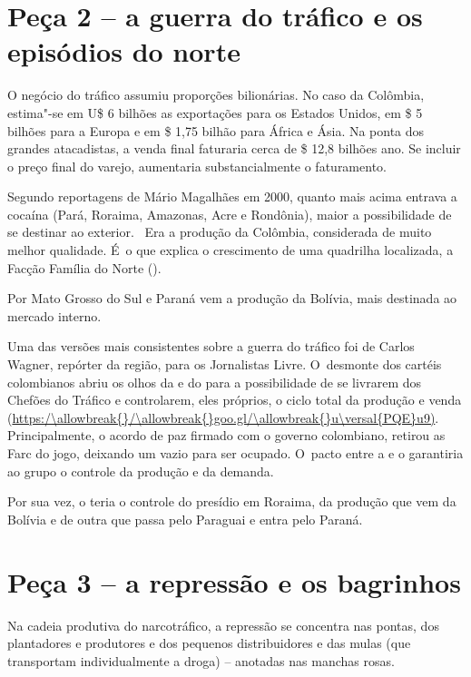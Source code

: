 \section{Peça 2 -- a guerra do tráfico e os episódios do norte}

O negócio do tráfico assumiu proporções bilionárias. No caso da
Colômbia, estima"-se em U\$ 6 bilhões as exportações para os Estados
Unidos, em \$ 5 bilhões para a Europa e em \$ 1,75 bilhão para
África e Ásia. Na ponta dos grandes atacadistas, a venda final faturaria
cerca de \$ 12,8 bilhões ano. Se incluir o preço final do varejo,
aumentaria substancialmente o faturamento.

Segundo reportagens de Mário Magalhães em 2000, quanto mais acima
entrava a cocaína (Pará, Roraima, Amazonas, Acre e Rondônia), maior a
possibilidade de se destinar ao exterior. ~Era a produção da Colômbia,
considerada de muito melhor qualidade. É~o que explica o crescimento de
uma quadrilha localizada, a Facção Família do Norte ().

Por Mato Grosso do Sul e Paraná vem a produção da Bolívia, mais
destinada ao mercado interno.

Uma das versões mais consistentes sobre a guerra do tráfico foi de
Carlos Wagner, repórter da região, para os Jornalistas Livre. O~desmonte
dos cartéis colombianos abriu os olhos da  e do  para a
possibilidade de se livrarem dos Chefões do Tráfico e controlarem, eles
próprios, o ciclo total da produção e venda
(\url{https:/\allowbreak{}/\allowbreak{}goo.gl/\allowbreak{}u\versal{PQE}u9)}. Principalmente, o acordo de paz firmado
com o governo colombiano, retirou as Farc do jogo, deixando um vazio
para ser ocupado. O~pacto entre a  e o  garantiria ao grupo o
controle da produção e da demanda.

Por sua vez, o  teria o controle do presídio em Roraima, da produção
que vem da Bolívia e de outra que passa pelo Paraguai e entra pelo
Paraná.

\section{Peça 3 -- a repressão e os bagrinhos}

Na cadeia produtiva do narcotráfico, a repressão se concentra nas
pontas, dos plantadores e produtores e dos pequenos distribuidores e das
mulas (que transportam individualmente a droga) -- anotadas nas manchas
rosas.

